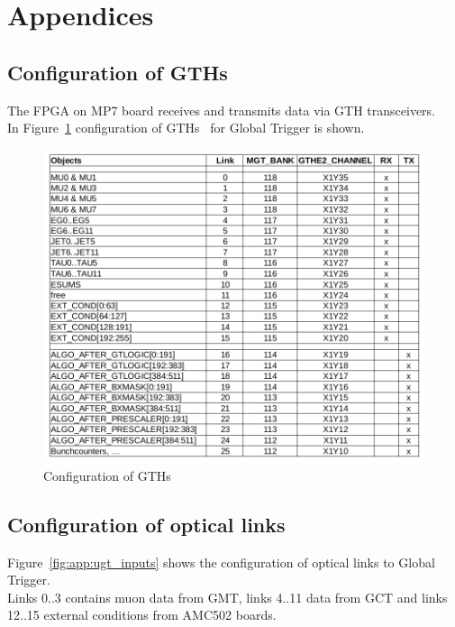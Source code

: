 \section{Appendices}\label{sec:app:app}

\subsection{Configuration of GTHs}\label{sec:app:app_a}

The FPGA on MP7 board receives and transmits data via GTH transceivers.\\
In Figure~\ref{fig:app:gth_conf} configuration of GTHs~\cite{GTHs} for Global Trigger is shown.

\begin{figure}[htb]
\centering
\includegraphics[width=15cm]{figures/gth_xc7v690t_ffg1927}
\caption{Configuration of GTHs}
\label{fig:app:gth_conf}
\end{figure}

\clearpage

\subsection{Configuration of optical links}\label{sec:app:app_b}

Figure~\ref{fig:app:ugt_inputs} shows the configuration of optical links to Global Trigger.\\
Links 0..3 contains muon data from GMT, links 4..11 data from GCT and links 12..15 external conditions
from AMC502 boards.

